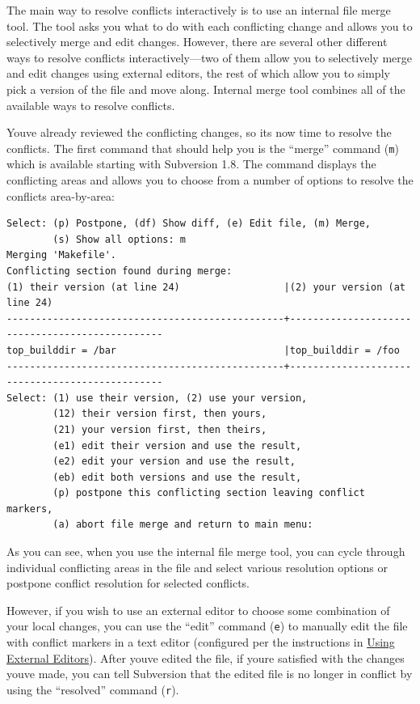 The main way to resolve conflicts interactively is to use an internal
file merge tool. The tool asks you what to do with each conflicting
change and allows you to selectively merge and edit changes. However,
there are several other different ways to resolve conflicts
interactively---two of them allow you to selectively merge and edit
changes using external editors, the rest of which allow you to simply
pick a version of the file and move along. Internal merge tool combines
all of the available ways to resolve conflicts.

You\textquotesingle ve already reviewed the conflicting changes, so
it\textquotesingle s now time to resolve the conflicts. The first
command that should help you is the ``merge'' command (\texttt{m}) which
is available starting with Subversion 1.8. The command displays the
conflicting areas and allows you to choose from a number of options to
resolve the conflicts area-by-area:

\begin{verbatim}
Select: (p) Postpone, (df) Show diff, (e) Edit file, (m) Merge,
        (s) Show all options: m
Merging 'Makefile'.
Conflicting section found during merge:
(1) their version (at line 24)                  |(2) your version (at line 24)
------------------------------------------------+------------------------------------------------
top_builddir = /bar                             |top_builddir = /foo
------------------------------------------------+------------------------------------------------
Select: (1) use their version, (2) use your version,
        (12) their version first, then yours,
        (21) your version first, then theirs,
        (e1) edit their version and use the result,
        (e2) edit your version and use the result,
        (eb) edit both versions and use the result,
        (p) postpone this conflicting section leaving conflict markers,
        (a) abort file merge and return to main menu:
\end{verbatim}

As you can see, when you use the internal file merge tool, you can cycle
through individual conflicting areas in the file and select various
resolution options or postpone conflict resolution for selected
conflicts.

However, if you wish to use an external editor to choose some
combination of your local changes, you can use the ``edit'' command
(\texttt{e}) to manually edit the file with conflict markers in a text
editor (configured per the instructions in
\hyperref[svn.advanced.externaleditors]{Using External Editors}). After
you\textquotesingle ve edited the file, if you\textquotesingle re
satisfied with the changes you\textquotesingle ve made, you can tell
Subversion that the edited file is no longer in conflict by using the
``resolved'' command (\texttt{r}).

